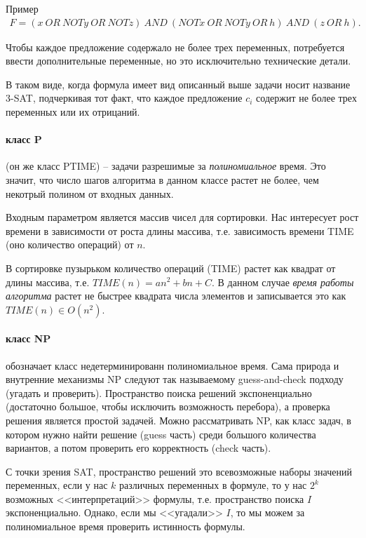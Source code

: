 \documentclass[%
	11pt,
	a4paper,
	utf8,
		]{article}
\begin{document}
Пример
\begin{align*}
	F = (x \ OR \ NOT y \ OR \ NOT z) \ AND \ (NOT x \ OR \ NOT y \ OR \ h) \ AND \ (z \ OR \ h).
\end{align*}

Чтобы каждое предложение содержало не более трех переменных, потребуется ввести дополнительные переменные, но это исключительно технические детали.

В таком виде, когда формула имеет вид описанный выше задачи носит название 3-SAT, подчеркивая тот факт, что каждое предложение $ c_i $ содержит не более трех переменных или их отрицаний.

\paragraph{класс P} (он же класс PTIME) -- задачи разрешимые за \emph{полиномиальное} время. Это значит, что число шагов алгоритма в данном классе растет не более, чем некотрый полином от входных данных.

Входным параметром является массив чисел для сортировки. Нас интересует рост времени в зависимости от роста длины массива, т.е. зависимость времени TIME (оно количество операций) от $ n $. 

В сортировке пузырьком количество операций (TIME) растет как квадрат от длины массива, т.е. $ TIME(n) = a n^2 + b n + C $. В данном случае \emph{время работы алгоритма} растет не быстрее квадрата числа элементов и записывается это как $ TIME(n) \in O(n^2) $.

\paragraph{класс NP} обозначает класс недетерминированн полиномиальное время. Сама природа и внутренние механизмы NP следуют так называемому guess-and-check подходу (угадать и проверить). Пространство поиска решений экспоненциально (достаточно большое, чтобы исключить возможность перебора), а проверка решения является простой задачей. Можно рассматривать NP, как класс задач, в котором нужно найти решение (guess часть) среди большого количества вариантов, а потом проверить его корректность (check часть).

 С точки зрения SAT, пространство решений это всевозможные наборы значений переменных, если у нас $ k $ различных переменных в формуле, то у нас $ 2^k $ возможных <<интерпретаций>> формулы, т.е. пространство поиска $ I $ экспоненциально. Однако, если мы <<угадали>> $ I $, то мы можем за полиномиальное время проверить истинность формулы.
\end{document}
